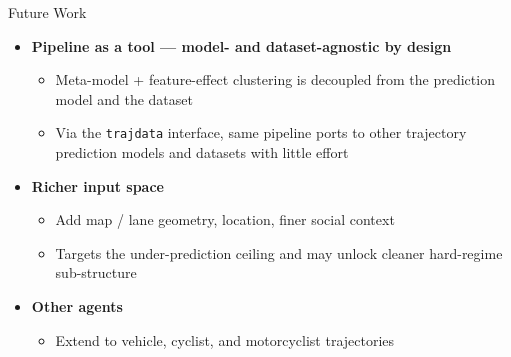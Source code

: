 \begin{frame}{Future Work}
  \begin{itemize}[<+->]
    \item \textbf{Pipeline as a tool — model- and dataset-agnostic by design}
      \begin{itemize}[<1->]
        \item Meta-model + feature-effect clustering is decoupled from
              the prediction model and the dataset
        \item Via the \texttt{trajdata} interface, same pipeline
              ports to other trajectory prediction models and datasets
              with little effort
      \end{itemize}
    \item \textbf{Richer input space}
      \begin{itemize}[<2->]
        \item Add map / lane geometry, location, finer social context
        \item Targets the under-prediction ceiling and may unlock
              cleaner hard-regime sub-structure
      \end{itemize}
    \item \textbf{Other agents}
      \begin{itemize}[<3->]
        \item Extend to vehicle, cyclist, and motorcyclist trajectories
      \end{itemize}
  \end{itemize}
\end{frame}
